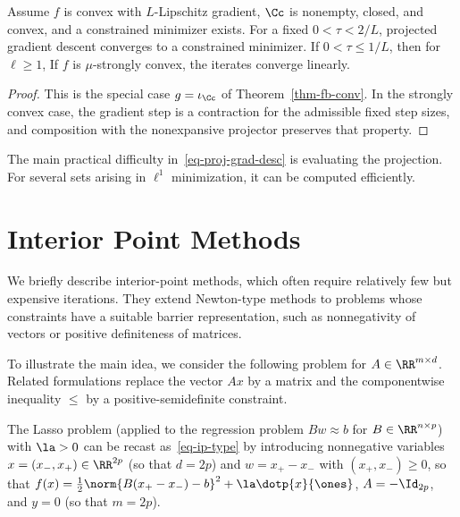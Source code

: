 \begin{thm}\label{thm-proj-grad}
Assume $f$ is convex with $L$-Lipschitz gradient, $\Cc$ is nonempty, closed, and convex, and a constrained minimizer exists. For a fixed $0<\tau<2/L$, projected gradient descent converges to a constrained minimizer. If $0<\tau\leq1/L$, then for $\ell\geq1$,
If $f$ is $\mu$-strongly convex, the iterates converge linearly.
\end{thm}
\begin{proof}
This is the special case $g=\iota_\Cc$ of Theorem~\ref{thm-fb-conv}. In the strongly convex case, the gradient step is a contraction for the admissible fixed step sizes, and composition with the nonexpansive projector preserves that property.
\end{proof}

The main practical difficulty in~\eqref{eq-proj-grad-desc} is evaluating the projection. For several sets arising in $\ell^1$ minimization, it can be computed efficiently.


\section{Interior Point Methods}

We briefly describe interior-point methods, which often require relatively few but expensive iterations. They extend Newton-type methods to problems whose constraints have a suitable barrier representation, such as nonnegativity of vectors or positive definiteness of matrices.


To illustrate the main idea, we consider the following problem
for $A \in \RR^{m \times d}$.
%
Related formulations replace the vector $A x$ by a matrix and the componentwise inequality $\leq$ by a positive-semidefinite constraint.

\begin{exmp}[Lasso]
	The Lasso problem (applied to the regression problem $Bw \approx b$ for $B \in \RR^{n \times p}$)
	with $\la>0$ can be recast as~\eqref{eq-ip-type} by introducing nonnegative variables
	$x=(x_-,x_+) \in \RR^{2p}$ (so that $d=2p$)  and $w = x_+ - x_-$ with $(x_+,x_-) \geq 0$, so that 
	$f(x) = \frac{1}{2}\norm{B(x_+-x_-)-b}^2 + \la \dotp{x}{\ones}$, $A=-\Id_{2p}$, and $y=0$ (so that $m=2p$).
\end{exmp}

